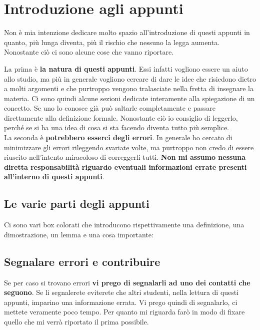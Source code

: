 \section{Introduzione agli appunti}

Non è mia intenzione dedicare molto spazio all'introduzione di questi appunti in quanto, più lunga diventa, più il rischio che nessuno la legga aumenta. Nonostante ciò ci sono alcune cose che vanno riportare. 

La prima è \textbf{la natura di questi appunti}. Essi infatti vogliono essere un aiuto allo studio, ma più in generale vogliono cercare di dare le idee che risiedono dietro a molti argomenti e che purtroppo vengono tralasciate nella fretta di insegnare la materia. Ci sono quindi alcune sezioni dedicate interamente alla spiegazione di un concetto. Se uno lo conosce già può saltarle completamente e passare direttamente alla definizione formale. Nonostante ciò io consiglio di leggerlo, perché se si ha una idea di cosa si sta facendo diventa tutto più semplice.\\

La seconda è \textbf{potrebbero esserci degli errori}. In generale ho cercato di minimizzare gli errori rileggendo svariate volte, ma purtroppo non credo di essere riuscito nell'intento miracoloso di correggerli tutti. \textbf{Non mi assumo nessuna diretta responsabilità riguardo eventuali informazioni errate presenti all'interno di questi appunti}.

\subsection{Le varie parti degli appunti}
Ci sono vari box colorati che introducono rispettivamente una definizione, una dimostrazione, un lemma e una cosa importante:






\subsection{Segnalare errori e contribuire}
Se per caso si trovano errori \textbf{vi prego di segnalarli ad uno dei contatti che seguono}. Se li segnalerete eviterete che altri studenti, nella lettura di questi appunti, imparino una informazione errata. Vi prego quindi di segnalarlo, ci mettete veramente poco tempo. Per quanto mi riguarda farò in modo di fixare quello che mi verrà riportato il prima possibile.\\

